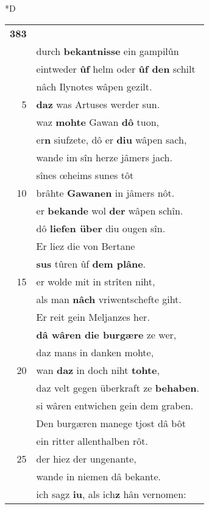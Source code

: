\documentclass[8pt,a4paper,notitlepage]{article}
\begin{document}
\begin{table}[ht]
\begin{minipage}[t]{0.5\linewidth}
\small
\begin{center}*D
\end{center}
\begin{tabular}{rl}
\textbf{383} & \textbf{\begin{large}O\end{large}uch hete} ieslîch Bertun\\ 
 & durch \textbf{bekantnisse} ein gampilûn\\ 
 & eintweder \textbf{ûf} helm oder \textbf{ûf den} schilt\\ 
 & nâch Ilynotes wâpen gezilt.\\ 
5 & \textbf{daz} was Artuses werder sun.\\ 
 & waz \textbf{mohte} Gawan \textbf{dô} tuon,\\ 
 & er\textbf{n} siufzete, dô er \textbf{diu} wâpen sach,\\ 
 & wande im sîn herze jâmers jach.\\ 
 & sînes œheims sunes tôt\\ 
10 & brâhte \textbf{Gawanen} in jâmers nôt.\\ 
 & er \textbf{bekande} wol \textbf{der} wâpen schîn.\\ 
 & dô \textbf{liefen über} diu ougen sîn.\\ 
 & Er liez die von Bertane\\ 
 & \textbf{sus} tûren ûf \textbf{dem plâne}.\\ 
15 & er wolde mit in strîten niht,\\ 
 & als man \textbf{nâch} vriwentschefte giht.\\ 
 & Er reit gein Meljanzes her.\\ 
 & \textbf{dâ wâren die burgære} ze wer,\\ 
 & daz mans in danken mohte,\\ 
20 & wan \textbf{daz} in doch niht \textbf{tohte},\\ 
 & daz velt gegen überkraft ze \textbf{behaben}.\\ 
 & si wâren entwichen gein dem graben.\\ 
 & Den burgæren manege tjost dâ bôt\\ 
 & ein ritter allenthalben rôt.\\ 
25 & der hiez der ungenante,\\ 
 & wande in niemen dâ bekante.\\ 
 & ich sagz \textbf{iu}, als ich\textbf{z} hân vernomen:\\ 

\end{tabular}
\end{minipage}
\end{table}
\end{document}
